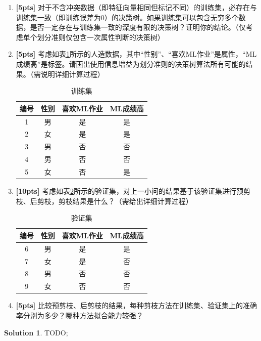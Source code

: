 \documentclass[a4paper,UTF8]{article}
\theoremstyle{definition}
\newtheorem*{solution}{Solution}
\begin{document}
\begin{enumerate}[(1)]
	\item \textbf{[5pts]} 对于不含冲突数据（即特征向量相同但标记不同）的训练集，必存在与训练集一致（即训练误差为$0$）的决策树。如果训练集可以包含无穷多个数据，是否一定存在与训练集一致的深度有限的决策树？证明你的结论。（仅考虑单个划分准则仅包含一次属性判断的决策树）
	\item \textbf{[5pts]} 考虑如表\ref{train data for tree}所示的人造数据，其中“性别”、“喜欢ML作业”是属性，“ML成绩高”是标签。请画出使用信息增益为划分准则的决策树算法所有可能的结果。（需说明详细计算过程）
	\begin{table}[h]
		\caption{训练集}
		\label{train data for tree}
		\centering
		\begin{tabular}{cccc}
			\hline 
			编号 & 性别 & 喜欢ML作业 & ML成绩高 \\ 
			\hline 
			1 & 男 & 是 & 是 \\ 
			2 & 女 & 是 & 是 \\ 
			3 & 男 & 否 & 否 \\ 
			4 & 男 & 否 & 否 \\ 
			5 & 女 & 否 & 是 \\ 
			\hline 
		\end{tabular}
	\end{table}
	\item \textbf{[10pts]} 考虑如表\ref{validation data for tree}所示的验证集，对上一小问的结果基于该验证集进行预剪枝、后剪枝，剪枝结果是什么？（需给出详细计算过程）
	\begin{table}[h]
		\caption{验证集}
		\label{validation data for tree}
		\centering
		\begin{tabular}{cccc}
			\hline 
			编号 & 性别 & 喜欢ML作业 & ML成绩高 \\ 
			\hline 
			6 & 男 & 是 & 是 \\ 
			7 & 女 & 是 & 否 \\ 
			8 & 男 & 否 & 否 \\ 
			9 & 女 & 否 & 否 \\ 
			\hline 
		\end{tabular}
	\end{table}
	\item \textbf{[5pts]} 比较预剪枝、后剪枝的结果，每种剪枝方法在训练集、验证集上的准确率分别为多少？哪种方法拟合能力较强？
\end{enumerate}

\begin{solution}
	TODO;
\end{solution}
\end{document}
